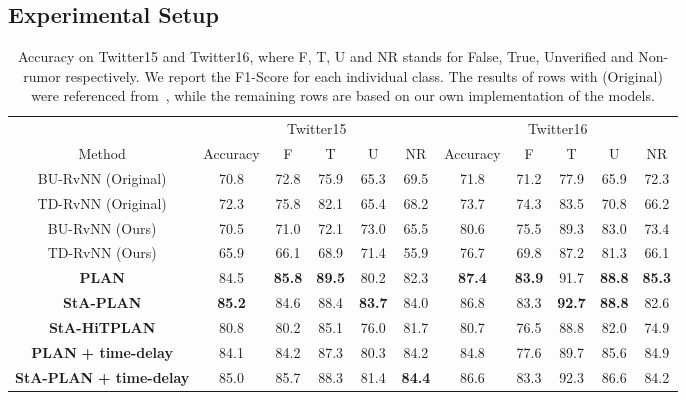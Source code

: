 \documentclass[letterpaper]{article} %
\begin{document}
\subsection{Experimental Setup}

\begin{table}[ht]
\small
\centering
\begin{tabular}{ccccccccccc} \toprule
& \multicolumn{5}{c}{Twitter15} & \multicolumn{5}{c}{Twitter16} \\
Method		&	Accuracy & F & T & U & NR & Accuracy & F & T & U & NR \\ \midrule
BU-RvNN	(Original) & 70.8 & 72.8 & 75.9 & 65.3 & 69.5
& 71.8 & 71.2 & 77.9 & 65.9 & 72.3\\
TD-RvNN (Original) & 72.3 & 75.8 & 82.1 & 65.4 & 68.2
& 73.7 & 74.3 & 83.5 & 70.8 & 66.2 \\
BU-RvNN (Ours)	& 70.5 & 71.0 & 72.1 & 73.0 & 65.5
& 80.6 & 75.5 & 89.3 & 83.0 & 73.4\\
TD-RvNN	(Ours) & 65.9 & 66.1 & 68.9 & 71.4 & 55.9
& 76.7 & 69.8 & 87.2 & 81.3 & 66.1 \\
\midrule
\textbf{PLAN}	& 84.5 & \textbf{85.8} & \textbf{89.5} & 80.2 & 82.3
 & \textbf{87.4} & \textbf{83.9} & 91.7 & \textbf{88.8} & \textbf{85.3} \\
\textbf{StA-PLAN} & \textbf{85.2} & 84.6 & 88.4 & \textbf{83.7} & 84.0
& 86.8 & 83.3 & \textbf{92.7} & \textbf{88.8} & 82.6\\
\textbf{StA-HiTPLAN} & 80.8 & 80.2 & 85.1 & 76.0 & 81.7
& 80.7 & 76.5 & 88.8 & 82.0 & 74.9 \\
\textbf{PLAN} \textbf{+ time-delay}	& 84.1 & 84.2 & 87.3 & 80.3 & 84.2
& 84.8 & 77.6 & 89.7 & 85.6 & 84.9\\
\textbf{StA-PLAN} \textbf{+ time-delay} & 85.0 & 85.7 & 88.3 & 81.4 & \textbf{84.4}
 & 86.6 & 83.3 & 92.3 & 86.6 & 84.2 \\
\bottomrule
\end{tabular}
\caption{Accuracy on Twitter15 and Twitter16, where F, T, U and NR stands for False, True, Unverified and Non-rumor respectively. We report the F1-Score for each individual class. The results of rows with (Original) were referenced from~\cite{ma17}, while the remaining rows are based on our own implementation of the models.}
\label{tab:results_15}
\end{table}
\end{document}
